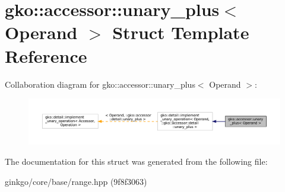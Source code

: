 \hypertarget{structgko_1_1accessor_1_1unary__plus}{}\section{gko\+:\+:accessor\+:\+:unary\+\_\+plus$<$ Operand $>$ Struct Template Reference}
\label{structgko_1_1accessor_1_1unary__plus}


Collaboration diagram for gko\+:\+:accessor\+:\+:unary\+\_\+plus$<$ Operand $>$\+:
\nopagebreak
\begin{figure}[H]
\begin{center}
\leavevmode
\includegraphics[width=350pt]{structgko_1_1accessor_1_1unary__plus__coll__graph}
\end{center}
\end{figure}


The documentation for this struct was generated from the following file\+:\begin{DoxyCompactItemize}
\item 
ginkgo/core/base/range.\+hpp (9f8f3063)\end{DoxyCompactItemize}
